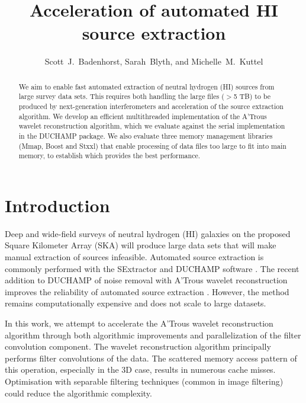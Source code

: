 \documentclass[11pt, twoside]{article}
\begin{document}

\title{Acceleration of automated HI source extraction} 

\author{Scott~J.~Badenhorst, Sarah~Blyth, and Michelle~M.~Kuttel
}


\begin{abstract}
We aim to enable fast automated extraction of neutral hydrogen (HI)  sources from large survey data sets. 
This requires both handling the large files ($>$5 TB) to be produced by next-generation interferometers and acceleration of  the source extraction algorithm. 
We develop an efficient multithreaded implementation of the A'Trous wavelet reconstruction algorithm, which we evaluate against the serial implementation in the DUCHAMP package.  We also evaluate three memory management libraries (Mmap, Boost and Stxxl) that enable processing of data files too large to fit into main memory, to establish which provides the best performance. 
\end{abstract}




\section{Introduction}

Deep and wide-field surveys of neutral hydrogen (HI) galaxies on the proposed Square Kilometer Array (SKA) will produce 
large data sets that will make manual extraction of sources infeasible.  Automated source extraction is commonly performed with the SExtractor \citep{Bertin1996} and DUCHAMP software \citep{Whiting2012}.  
 The recent addition to DUCHAMP of  noise removal with A'Trous wavelet reconstruction \citep{West2010} improves the reliability of automated source extraction \citep{Popping2012, Whiting2012}.  
However, the method remains computationally expensive and does not scale to large datasets.  

In this work, we attempt to accelerate the A'Trous wavelet reconstruction algorithm through both algorithmic improvements and parallelization of the filter convolution component. 
The wavelet reconstruction algorithm  principally performs filter convolutions of the data. The scattered memory access pattern of this operation, especially in the 3D case, results in numerous cache misses.  Optimisation with separable filtering techniques (common in image filtering) could reduce the algorithmic complexity. 
\end{document}
